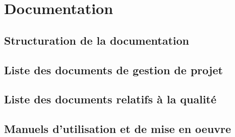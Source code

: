 \section{Documentation}

\subsection{Structuration de la documentation}

\subsection{Liste des documents de gestion de projet}

\subsection{Liste des documents relatifs à la qualité}

\subsection{Manuels d'utilisation et de mise en oeuvre}
\pagebreak
